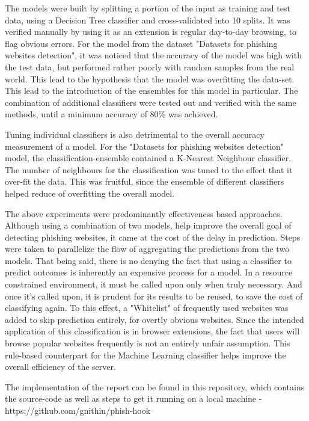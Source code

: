 \documentclass[conference]{IEEEtran}
\begin{document}
\par The models were built by splitting a portion of the input as training and test data, using a Decision Tree classifier and cross-validated into 10 splits. It was verified manually by using it as an extension is regular day-to-day browsing, to flag obvious errors. For the model from the dataset "Datasets  for  phishing  websites  detection", it was noticed that the accuracy of the model was high with the test data, but performed rather poorly with random samples from the real world. This lead to the hypothesis that the model was overfitting the data-set. This lead to the introduction of the ensembles for this model in particular. The combination of additional classifiers were tested out and verified with the same methods, until a minimum accuracy of 80\% was achieved.

\par Tuning individual classifiers is also detrimental to the overall accuracy measurement of a model. For the "Datasets  for  phishing  websites  detection" model, the classification-ensemble contained a K-Nearest Neighbour classifier. The number of neighbours for the classification was tuned to the effect that it over-fit the data. This was fruitful, since the ensemble of different classifiers helped reduce of overfitting the overall model.

\par The above experiments were predominantly effectiveness based approaches. Although using a combination of two models, help improve the overall goal of detecting phishing websites, it came at the cost of the delay in prediction. Steps were taken to parallelize the flow of aggregating the predictions from the two models. That being said, there is no denying the fact that using a classifier to predict outcomes is inherently an expensive process for a model. In a resource constrained environment, it must be called upon only when truly necessary. And once it's called upon, it is prudent for its results to be reused, to save the cost of classifying again. To this effect, a "Whitelist" of frequently used websites was added to skip prediction entirely, for overtly obvious websites. Since the intended application of this classification is in browser extensions,  the fact that users will browse popular websites frequently is not an entirely unfair assumption. This rule-based counterpart for the Machine Learning classifier helps improve the overall efficiency of the server.

\par The implementation of the report can be found in this repository, which contains the source-code as well as steps to get it running on a local machine - https://github.com/gnithin/phish-hook
\end{document}
